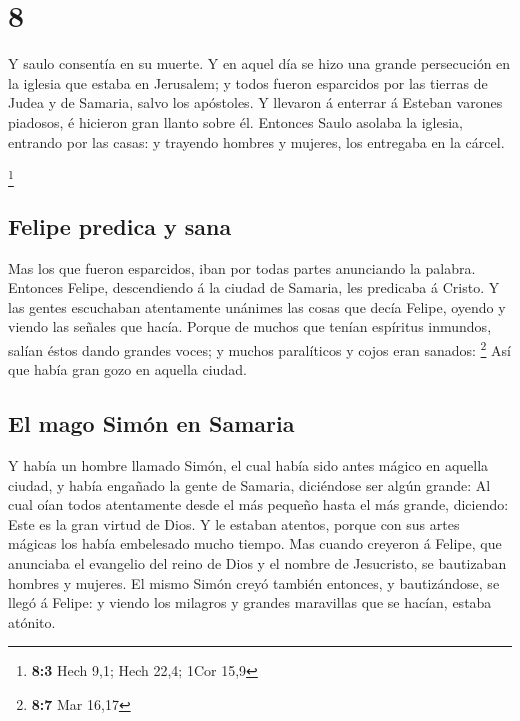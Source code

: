 \hypertarget{section-7}{%
\section{8}\label{section-7}}

 Y saulo consentía en su muerte. Y en aquel día se hizo una
grande persecución en la iglesia que estaba en Jerusalem; y todos fueron
esparcidos por las tierras de Judea y de Samaria, salvo los apóstoles.
 Y llevaron á enterrar á Esteban varones piadosos, é
hicieron gran llanto sobre él.  Entonces Saulo asolaba la
iglesia, entrando por las casas: y trayendo hombres y mujeres, los
entregaba en la cárcel.

\footnote{\textbf{8:3} Hech 9,1; Hech 22,4; 1Cor 15,9}

\hypertarget{felipe-predica-y-sana}{%
\subsection{Felipe predica y sana}\label{felipe-predica-y-sana}}

 Mas los que fueron esparcidos, iban por todas partes
anunciando la palabra.  Entonces Felipe, descendiendo á la
ciudad de Samaria, les predicaba á Cristo.  Y las gentes
escuchaban atentamente unánimes las cosas que decía Felipe, oyendo y
viendo las señales que hacía.  Porque de muchos que tenían
espíritus inmundos, salían éstos dando grandes voces; y muchos
paralíticos y cojos eran sanados: \footnote{\textbf{8:7} Mar 16,17}
 Así que había gran gozo en aquella ciudad.

\hypertarget{el-mago-simuxf3n-en-samaria}{%
\subsection{El mago Simón en
Samaria}\label{el-mago-simuxf3n-en-samaria}}

 Y había un hombre llamado Simón, el cual había sido antes
mágico en aquella ciudad, y había engañado la gente de Samaria,
diciéndose ser algún grande:  Al cual oían todos
atentamente desde el más pequeño hasta el más grande, diciendo: Este es
la gran virtud de Dios.  Y le estaban atentos, porque con
sus artes mágicas los había embelesado mucho tiempo.  Mas
cuando creyeron á Felipe, que anunciaba el evangelio del reino de Dios y
el nombre de Jesucristo, se bautizaban hombres y mujeres. 
El mismo Simón creyó también entonces, y bautizándose, se llegó á
Felipe: y viendo los milagros y grandes maravillas que se hacían, estaba
atónito.

